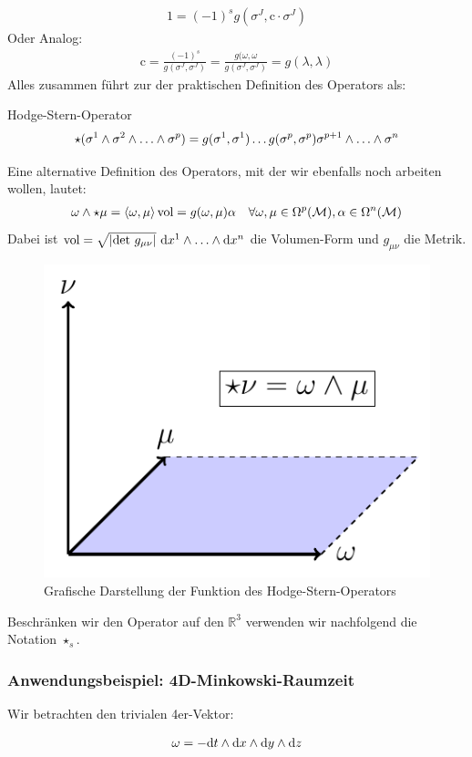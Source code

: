 \begin{align}
1 = (-1)^s g(\sigma^J,\text{c}\cdot\sigma^J)
\end{align}
Oder Analog:
\begin{align}
\text{c}= \frac{(-1)^s}{g(\sigma^J,\sigma^J)} = \frac{g(\omega,\omega}{g(\sigma^J,\sigma^J)} = g(\lambda,\lambda)
\end{align}
Alles zusammen führt zur der praktischen Definition des Operators als:
\begin{mybox}{Hodge-Stern-Operator}
\begin{align}
\star(\sigma^1 \w \sigma^2 \w \dots \w \sigma^p) = g(\sigma^1,\sigma^1)\dots g(\sigma^p,\sigma^p) \sigma^{p+1}\w \dots \w \sigma^n
\end{align}
\end{mybox}

Eine alternative Definition des Operators, mit der wir ebenfalls noch arbeiten wollen, lautet:
\begin{align}
\omega \wedge \star \mu = \left<\omega,\mu \right>\text{vol} = g(\omega,\mu)\alpha \quad \forall \omega, \mu \in \Omega^p(\mathcal{M}), \alpha \in \Omega^n(\mathcal{M})
\end{align}
Dabei ist $\text{vol} = \sqrt{\abs{\text{det} \ g_{\mu\nu}}} \ \dd x^1 \w \dots \w \dd x^n$ die Volumen-Form und $g_{\mu\nu}$ die Metrik. \\
\begin{figure}[H]
	\centering
	\includegraphics[width=.3\linewidth]{figures/darstellung-hodge.pdf}
	\caption{Grafische Darstellung der Funktion des Hodge-Stern-Operators}
\end{figure}
Beschränken wir den Operator auf den $\mathbb{R}^3$ verwenden wir nachfolgend die Notation $\star_s$.
\subsubsection{Anwendungsbeispiel: 4D-Minkowski-Raumzeit}

Wir betrachten den trivialen 4er-Vektor:

\begin{align}
\omega = - \dd t \wedge \dd x\wedge \dd y \wedge \dd z
\end{align}

